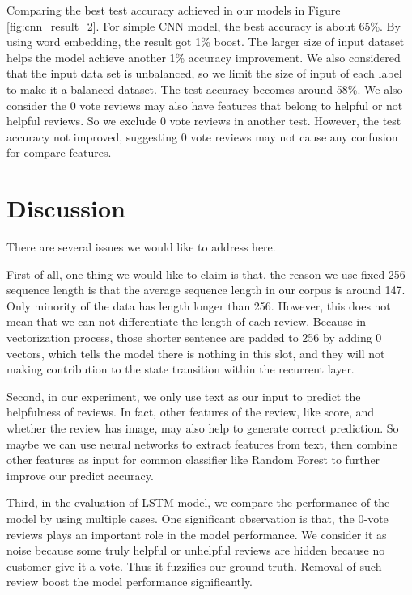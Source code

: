 \documentclass[11pt]{article}
\begin{document}
Comparing the best test accuracy achieved in our models in Figure \ref{fig:cnn_result_2}. For simple CNN model, the best accuracy is about 65\%. By using word embedding, the result got 1\% boost. The larger size of input dataset helps the model achieve another 1\% accuracy improvement. We also considered that the input data set is unbalanced, so we limit the size of input of each label to make it a balanced dataset. The test accuracy becomes around 58\%. We also consider the 0 vote reviews may also have features that belong to helpful or not helpful reviews. So we exclude 0 vote reviews in another test. However, the test accuracy not improved, suggesting 0 vote reviews may not cause any confusion for compare features.

\section{Discussion}

There are several issues we would like to address here.

First of all, one thing we would like to claim is that, the reason we use fixed 256 sequence length is that the average sequence length in our corpus is around 147. Only minority of the data has length longer than 256. However, this does not mean that we can not differentiate the length of each review. Because in vectorization process, those shorter sentence are padded to 256 by adding 0 vectors, which tells the model there is nothing in this slot, and they will not making contribution to the state transition within the recurrent layer.

Second, in our experiment, we only use text as our input to predict the helpfulness of reviews. In fact, other features of the review, like score, and whether the review has image, may also help to generate correct prediction. So maybe we can use neural networks to extract features from text, then combine other features as input for common classifier like Random Forest to further improve our predict accuracy.

Third, in the evaluation of LSTM model, we compare the performance of the model by using multiple cases. One significant observation is that, the 0-vote reviews plays an important role in the model performance. We consider it as noise because some truly helpful or unhelpful reviews are hidden because no customer give it a vote. Thus it fuzzifies our ground truth. Removal of such review boost the model performance significantly. 
\end{document}
